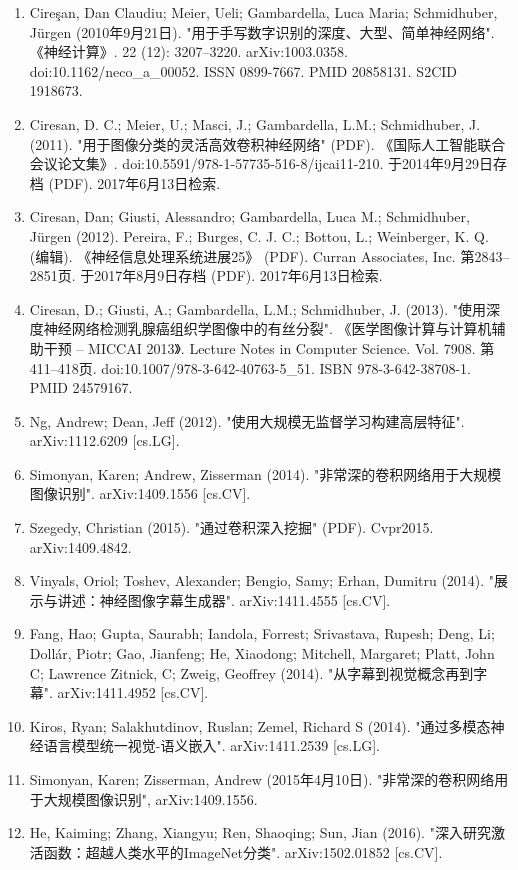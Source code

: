 \begin{enumerate}
\item Cireşan, Dan Claudiu; Meier, Ueli; Gambardella, Luca Maria; Schmidhuber, Jürgen (2010年9月21日). "用于手写数字识别的深度、大型、简单神经网络". 《神经计算》. 22 (12): 3207–3220. arXiv:1003.0358. doi:10.1162/neco_a_00052. ISSN 0899-7667. PMID 20858131. S2CID 1918673.
\item Ciresan, D. C.; Meier, U.; Masci, J.; Gambardella, L.M.; Schmidhuber, J. (2011). "用于图像分类的灵活高效卷积神经网络" (PDF). 《国际人工智能联合会议论文集》. doi:10.5591/978-1-57735-516-8/ijcai11-210. 于2014年9月29日存档 (PDF). 2017年6月13日检索.
\item Ciresan, Dan; Giusti, Alessandro; Gambardella, Luca M.; Schmidhuber, Jürgen (2012). Pereira, F.; Burges, C. J. C.; Bottou, L.; Weinberger, K. Q. (编辑). 《神经信息处理系统进展25》 (PDF). Curran Associates, Inc. 第2843–2851页. 于2017年8月9日存档 (PDF). 2017年6月13日检索.
\item Ciresan, D.; Giusti, A.; Gambardella, L.M.; Schmidhuber, J. (2013). "使用深度神经网络检测乳腺癌组织学图像中的有丝分裂". 《医学图像计算与计算机辅助干预 – MICCAI 2013》. Lecture Notes in Computer Science. Vol. 7908. 第411–418页. doi:10.1007/978-3-642-40763-5_51. ISBN 978-3-642-38708-1. PMID 24579167.
\item Ng, Andrew; Dean, Jeff (2012). "使用大规模无监督学习构建高层特征". arXiv:1112.6209 [cs.LG].
\item Simonyan, Karen; Andrew, Zisserman (2014). "非常深的卷积网络用于大规模图像识别". arXiv:1409.1556 [cs.CV].
\item Szegedy, Christian (2015). "通过卷积深入挖掘" (PDF). Cvpr2015. arXiv:1409.4842.
\item Vinyals, Oriol; Toshev, Alexander; Bengio, Samy; Erhan, Dumitru (2014). "展示与讲述：神经图像字幕生成器". arXiv:1411.4555 [cs.CV].
\item Fang, Hao; Gupta, Saurabh; Iandola, Forrest; Srivastava, Rupesh; Deng, Li; Dollár, Piotr; Gao, Jianfeng; He, Xiaodong; Mitchell, Margaret; Platt, John C; Lawrence Zitnick, C; Zweig, Geoffrey (2014). "从字幕到视觉概念再到字幕". arXiv:1411.4952 [cs.CV].
\item Kiros, Ryan; Salakhutdinov, Ruslan; Zemel, Richard S (2014). "通过多模态神经语言模型统一视觉-语义嵌入". arXiv:1411.2539 [cs.LG].
\item Simonyan, Karen; Zisserman, Andrew (2015年4月10日). "非常深的卷积网络用于大规模图像识别", arXiv:1409.1556.
\item He, Kaiming; Zhang, Xiangyu; Ren, Shaoqing; Sun, Jian (2016). "深入研究激活函数：超越人类水平的ImageNet分类". arXiv:1502.01852 [cs.CV].

\end{enumerate}
